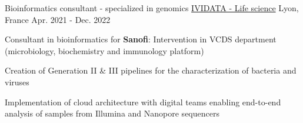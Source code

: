 \begin{cventries}
 \cventry
    {Bioinformatics consultant - specialized in genomics} %
    {\href{https://www.ividata.com/}{IVIDATA - Life science}} %
    {Lyon, France} %
    {Apr. 2021 - Dec. 2022} %
    {
      \begin{cvitems} %
        \item {Consultant in bioinformatics for \textcolor[HTML]{7A00E6}{\textbf{Sanofi}}: Intervention in VCDS department (microbiology, biochemistry and immunology platform)}
        \item {Creation of Generation II \& III pipelines for the characterization of bacteria and viruses}
        \item {Implementation of cloud architecture with digital teams enabling end-to-end analysis of samples from Illumina and Nanopore sequencers}
      \end{cvitems}
    }

\end{cventries}
